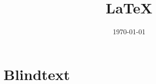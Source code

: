 \documentclass[a4paper,12pt]{scrartcl}
\title{\LaTeX}
\date{\today}
\begin{document}
\maketitle
\section{Blindtext}
	\blindtext 
\end{document}
